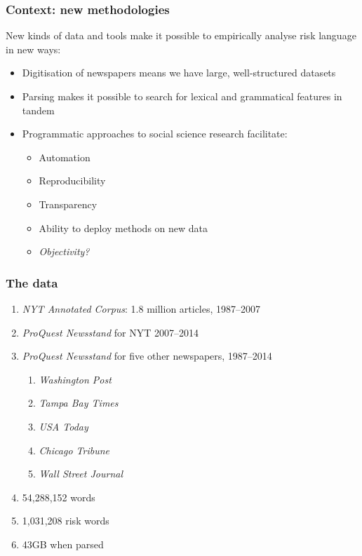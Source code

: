 \documentclass{beamer}       %
\begin{document}
\begin{frame}
    \frametitle{Context: new methodologies}

    New kinds of data and tools make it possible to empirically analyse risk language in new ways:
    
    \begin{itemize}
    \item Digitisation of newspapers means we have large, well-structured datasets
    \item Parsing makes it possible to search for lexical and grammatical features in tandem
    \item Programmatic approaches to social science research facilitate:
    \begin{itemize}
        \item Automation
        \item Reproducibility
        \item Transparency
        \item Ability to deploy methods on new data
        \item \emph{Objectivity?}
    \end{itemize}
    \end{itemize}
\end{frame}

\begin{frame}
    \frametitle{The data}

    \begin{enumerate}
        \item \emph{NYT Annotated Corpus}: 1.8 million articles, 1987--2007 \cite{sandhaus_new_2008}
        \item \emph{ProQuest Newsstand} for NYT 2007--2014
        \item \emph{ProQuest Newsstand} for five other newspapers, 1987--2014
        \begin{enumerate}
            \item \emph{Washington Post}
            \item \emph{Tampa Bay Times}
            \item \emph{USA Today}
            \item \emph{Chicago Tribune}
            \item \emph{Wall Street Journal}
        \end{enumerate}
        \item 54,288,152 words
        \item 1,031,208 risk words
        \item 43GB when parsed
    \end{enumerate}
\end{frame}
\end{document}
